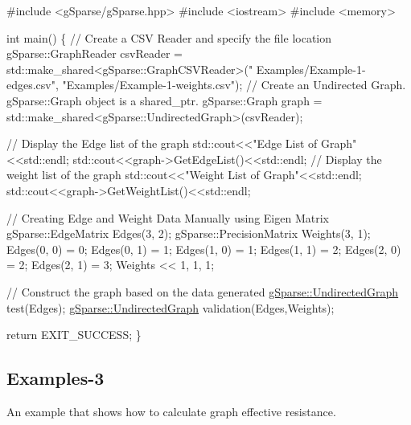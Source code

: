 \begin{DoxyCode}
\textcolor{preprocessor}{#include <gSparse/gSparse.hpp>}
\textcolor{preprocessor}{#include <iostream>}
\textcolor{preprocessor}{#include <memory>}

\textcolor{keywordtype}{int} main()
\{
    \textcolor{comment}{// Create a CSV Reader and specify the file location}
    gSparse::GraphReader csvReader = std::make\_shared<gSparse::GraphCSVReader>(\textcolor{stringliteral}{"
      Examples/Example-1-edges.csv"}, \textcolor{stringliteral}{"Examples/Example-1-weights.csv"});
    \textcolor{comment}{// Create an Undirected Graph. gSparse::Graph object is a shared\_ptr.}
    gSparse::Graph graph = std::make\_shared<gSparse::UndirectedGraph>(csvReader);

    \textcolor{comment}{// Display the Edge list of the graph}
    std::cout<<\textcolor{stringliteral}{"Edge List of Graph"}<<std::endl;
    std::cout<<graph->GetEdgeList()<<std::endl;
    \textcolor{comment}{// Display the weight list of the graph}
    std::cout<<\textcolor{stringliteral}{"Weight List of Graph"}<<std::endl;
    std::cout<<graph->GetWeightList()<<std::endl;

    \textcolor{comment}{// Creating Edge and Weight Data Manually using Eigen Matrix}
    gSparse::EdgeMatrix Edges(3, 2);
    gSparse::PrecisionMatrix Weights(3, 1);
    Edges(0, 0) = 0; Edges(0, 1) = 1;
    Edges(1, 0) = 1; Edges(1, 1) = 2;
    Edges(2, 0) = 2; Edges(2, 1) = 3;
    Weights << 1, 1, 1;

    \textcolor{comment}{// Construct the graph based on the data generated}
    \mbox{\hyperlink{classg_sparse_1_1_undirected_graph}{gSparse::UndirectedGraph}} test(Edges);
    \mbox{\hyperlink{classg_sparse_1_1_undirected_graph}{gSparse::UndirectedGraph}} validation(Edges,Weights);

    \textcolor{keywordflow}{return} EXIT\_SUCCESS;
\}
\end{DoxyCode}


\subsection*{Examples-\/3}

An example that shows how to calculate graph effective resistance.


